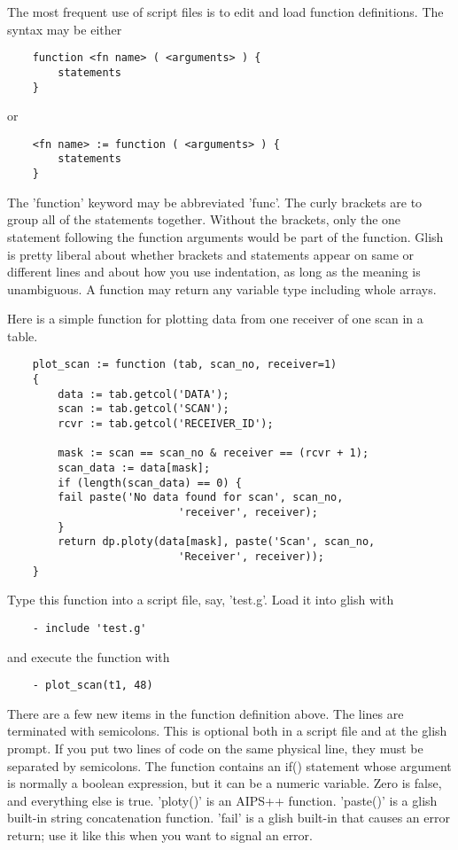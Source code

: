 The most frequent use of script files is to edit and load function
definitions.  The syntax may be either

\begin{verbatim}
	function <fn name> ( <arguments> ) {
	    statements
	}
\end{verbatim}
or
\begin{verbatim}
	<fn name> := function ( <arguments> ) {
	    statements
	}
\end{verbatim}

The 'function' keyword may be abbreviated 'func'.  The curly brackets are
to group all of the statements together.  Without the brackets, only the
one statement following the function arguments would be part of the
function.  Glish is pretty liberal about whether brackets and statements
appear on same or different lines and about how you use indentation, as
long as the meaning is unambiguous.  A function may return any variable
type including whole arrays.

    Here is a simple function for plotting data from one receiver of one
scan in a table.

\begin{verbatim}
	plot_scan := function (tab, scan_no, receiver=1)
	{
	    data := tab.getcol('DATA');
	    scan := tab.getcol('SCAN');
	    rcvr := tab.getcol('RECEIVER_ID');

	    mask := scan == scan_no & receiver == (rcvr + 1);
	    scan_data := data[mask];
	    if (length(scan_data) == 0) {
		fail paste('No data found for scan', scan_no, 
                           'receiver', receiver);
	    }
	    return dp.ploty(data[mask], paste('Scan', scan_no, 
                           'Receiver', receiver));
	}
\end{verbatim}

Type this function into a script file, say, 'test.g'.  Load it into glish
with

\begin{verbatim}
	- include 'test.g'
\end{verbatim}

and execute the function with

\begin{verbatim}
	- plot_scan(t1, 48)
\end{verbatim}

    There are a few new items in the function definition above.  The lines
are terminated with semicolons.  This is optional both in a script file and
at the glish prompt.  If you put two lines of code on the same physical
line, they must be separated by semicolons.  The function contains an if()
statement whose argument is normally a boolean expression, but it can be a
numeric variable.  Zero is false, and everything else is true.  'ploty()'
is an AIPS++ function.  'paste()' is a glish built-in string concatenation
function. 'fail' is a glish built-in that causes an error return; use
it like this when you want to signal an error.

